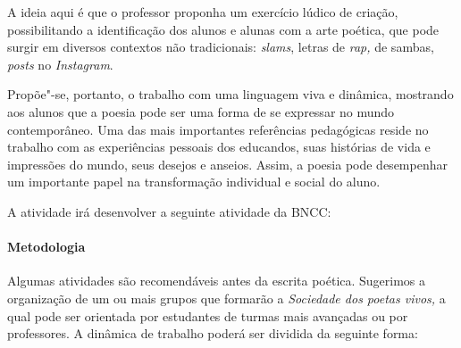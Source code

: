 \documentclass[11pt]{extarticle}
\begin{document}
A ideia aqui é que o professor proponha um exercício lúdico de criação,
possibilitando a identificação dos alunos e alunas com a arte poética,
que pode surgir em diversos contextos não tradicionais: \emph{slams},
letras de \emph{rap,} de sambas, \emph{posts} no \emph{Instagram}.

Propõe"-se, portanto, o trabalho com uma linguagem viva e dinâmica,
mostrando aos alunos que a poesia pode ser uma forma de se expressar no
mundo contemporâneo. Uma das mais importantes referências pedagógicas
reside no trabalho com as experiências pessoais dos educandos, suas
histórias de vida e impressões do mundo, seus desejos e anseios. Assim,
a poesia pode desempenhar um importante papel na transformação
individual e social do aluno.

A atividade irá desenvolver a seguinte atividade da BNCC:


\paragraph{Metodologia}

Algumas atividades são recomendáveis antes da escrita poética. Sugerimos
a organização de um ou mais grupos que formarão a \emph{Sociedade dos
poetas vivos,} a qual pode ser orientada por estudantes de turmas mais
avançadas ou por professores. A dinâmica de trabalho poderá ser dividida
da seguinte forma:
\end{document}
